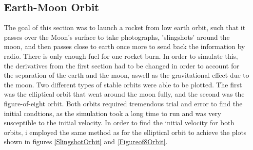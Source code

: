 \documentclass{revtex4-2}
\begin{document}
\subsection{Earth-Moon Orbit}
The goal of this section was to launch a rocket from low earth orbit, such that it passes over the Moon's surface to take photographs, 'slingshots'
around the moon, and then passes close to earth once more to send back the information by radio. There is only enough fuel for one rocket burn.
In order to simulate this, the derivatives from the first section had to be changed in order to account for the separation of the earth and the moon,
aswell as the gravitational effect due to the moon. Two different types of stable orbits were able to be plotted. The first was the elliptical orbit that
went around the moon fully, and the second was the figure-of-eight orbit. Both orbits required tremendous trial and error to find
the initial condtions, as the simulation took a long time to run and was very susceptible to the initial velocity. In order to find the initial velocity
for both orbits, i employed the same method as for the elliptical orbit to achieve the plots shown in figures \ref{SlingshotOrbit} and \ref{Figureof8Orbit}.
\end{document}
